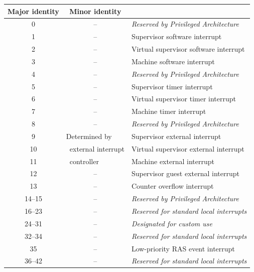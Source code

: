 \begin{table}[h!]
\begin{center}
\begin{tabular}{|c|c|l|}
\hline
Major identity & Minor identity & \\
\hline
\hline
0              & --             & \em Reserved by Privileged Architecture \\
\hline
1              & --             & Supervisor software interrupt \\
2              & --             & Virtual supervisor software interrupt \\
3              & --             & Machine software interrupt \\
\hline
4              & --             & \em Reserved by Privileged Architecture \\
\hline
5              & --             & Supervisor timer interrupt \\
6              & --             & Virtual supervisor timer interrupt \\
7              & --             & Machine timer interrupt \\
\hline
8              & --             & \em Reserved by Privileged Architecture \\
\hline
9              & \multicolumn{1}{l|}{Determined by}
                                & Supervisor external interrupt \\
10             & \multicolumn{1}{l|}{\ external interrupt}
                                & Virtual supervisor external interrupt \\
11             & \multicolumn{1}{l|}{\ controller}
                                & Machine external interrupt \\
\hline
12                   & -- & Supervisor guest external interrupt \\
13                   & -- & Counter overflow interrupt \\
14--15               & -- & \em Reserved by Privileged Architecture \\
\hline
\hline
16--23         & --       & \em Reserved for standard local interrupts \\
\hline
24--31         & --       & \em Designated for custom use \\
\hline
32--34         & --       & \em Reserved for standard local interrupts \\
35             & --       & Low-priority RAS event interrupt \\
36--42         & --       & \em Reserved for standard local interrupts \\

\end{tabular}
\end{center}
\end{table}
